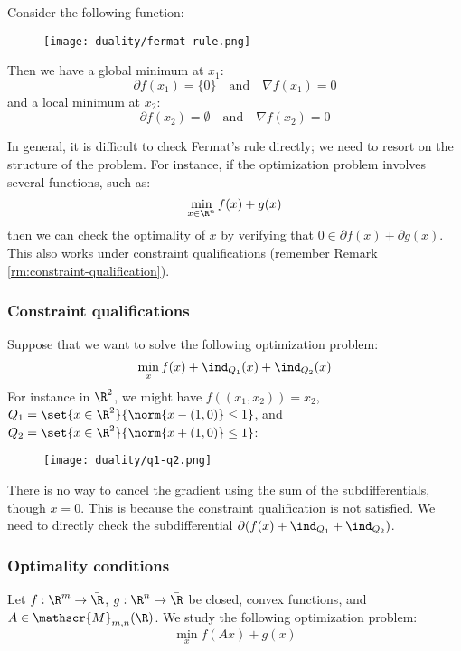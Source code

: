 \begin{example}
    Consider the following function:
    \begin{figure}[H]
        \centering
        \texttt{[image: duality/fermat-rule.png]}
    \end{figure}
    Then we have a global minimum at $x_1$:
    \begin{equation*}
        \partial f(x_1) = \{0\} \quad\text{and}\quad \nabla f(x_1)=0
    \end{equation*}
    and a local minimum at $x_2$:
    \begin{equation*}
        \partial f(x_2) = \emptyset \quad\text{and}\quad \nabla f(x_2)=0
    \end{equation*}
\end{example}

In general, it is difficult to check Fermat's rule directly; we need to resort on the structure of the problem. For instance, if the optimization problem involves several functions, such as:
\begin{equation*}
    \min_{x\in\R^n} f(x) + g(x)
\end{equation*}
then we can check the optimality of $x$ by verifying that $0\in\partial f(x) + \partial g(x)$. This also works under constraint qualifications (remember Remark \ref{rm:constraint-qualification}).

\subsubsection{Constraint qualifications}
Suppose that we want to solve the following optimization problem:
\begin{equation*}
    \min_x f(x) + \ind_{Q_1}(x) + \ind_{Q_2}(x)
\end{equation*}
For instance in $\R^2$, we might have $f((x_1, x_2))=x_2$, $Q_1=\set{x\in\R^2}{\norm{x-(1, 0)}\leq 1}$, and $Q_2=\set{x\in\R^2}{\norm{x+(1, 0)}\leq 1}$:
\begin{figure}[H]
    \centering
    \texttt{[image: duality/q1-q2.png]}
\end{figure}
There is no way to cancel the gradient using the sum of the subdifferentials, though $x=0$. This is because the constraint qualification is not satisfied. We need to directly check the subdifferential $\partial (f(x) + \ind_{Q_1} + \ind_{Q_2})$.

\subsubsection{Optimality conditions}
Let $f:\R^m\to\bar{\R}$, $g:\R^n\to\bar{\R}$ be closed, convex functions, and $A\in\mathscr{M}_{m, n}(\R)$. We study the following optimization problem:
\begin{equation}
    \label{eq:opt-condition}
    \min_x f(Ax)+g(x)
\end{equation}

